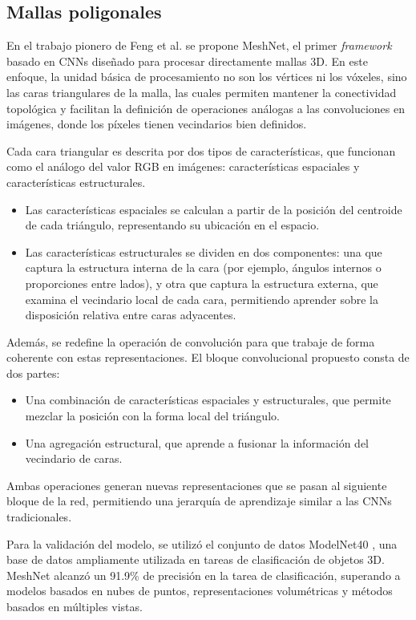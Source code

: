 \subsection{Mallas poligonales}
\label{section3:meshes}

En el trabajo pionero de Feng et al. \cite{feng2019meshnet} se propone MeshNet, el primer \textit{framework} basado en CNNs diseñado para procesar directamente mallas 3D. En este enfoque, la unidad básica de procesamiento no son los vértices ni los vóxeles, sino las caras triangulares de la malla, las cuales permiten mantener la conectividad topológica y facilitan la definición de operaciones análogas a las convoluciones en imágenes, donde los píxeles tienen vecindarios bien definidos.

Cada cara triangular es descrita por dos tipos de características, que funcionan como el análogo del valor RGB en imágenes: características espaciales y características estructurales.
\begin{itemize}
    \item Las características espaciales se calculan a partir de la posición del centroide de cada triángulo, representando su ubicación en el espacio.
    \item Las características estructurales se dividen en dos componentes: una que captura la estructura interna de la cara (por ejemplo, ángulos internos o proporciones entre lados), y otra que captura la estructura externa, que examina el vecindario local de cada cara, permitiendo aprender sobre la disposición relativa entre caras adyacentes.
\end{itemize}
Además, se redefine la operación de convolución para que trabaje de forma coherente con estas representaciones. El bloque convolucional propuesto consta de dos partes:

\begin{itemize}
    \item Una combinación de características espaciales y estructurales, que permite mezclar la posición con la forma local del triángulo.
    \item Una agregación estructural, que aprende a fusionar la información del vecindario de caras.
\end{itemize}
Ambas operaciones generan nuevas representaciones que se pasan al siguiente bloque de la red, permitiendo una jerarquía de aprendizaje similar a las CNNs tradicionales.

Para la validación del modelo, se utilizó el conjunto de datos ModelNet40 \cite{wu20153d}, una base de datos ampliamente utilizada en tareas de clasificación de objetos 3D. MeshNet alcanzó un 91.9\% de precisión en la tarea de clasificación, superando a modelos basados en nubes de puntos, representaciones volumétricas y métodos basados en múltiples vistas.

